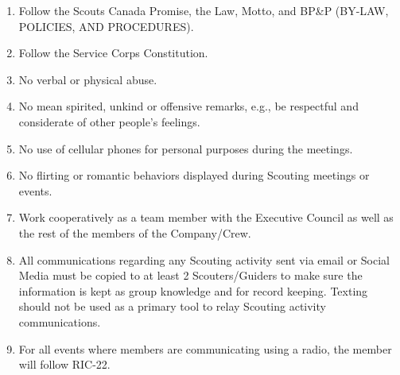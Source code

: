 \documentclass{Service_Corps_Document}
\begin{document}
    \def \Title {Code of Conduct}
    \def \Company {Service Corps}
    \def \versionNumber {3.0}
    \stdFooter
    \begin{titlepage}
        \stdTitlePage
    \end{titlepage}
    \begin{enumerate}
        \item Follow the Scouts Canada Promise, the Law, Motto, and BP\&P (BY-LAW, POLICIES, AND PROCEDURES).
        \item Follow the Service Corps Constitution.
        \item No verbal or physical abuse.
        \item No mean spirited, unkind or offensive remarks, e.g., be respectful and considerate of other people's feelings.
        \item No use of cellular phones for personal purposes during the meetings.
        \item No flirting or romantic behaviors displayed during Scouting meetings or events.
        \item Work cooperatively as a team member with the Executive Council as well as the rest of the members of the Company/Crew.
        \item All communications regarding any Scouting activity sent via email or Social Media must be copied to at least 2 Scouters/Guiders to make sure the information is kept as group knowledge and for record keeping.
        Texting should not be used as a primary tool to relay Scouting activity communications.
        \item For all events where members are communicating using a radio, the member will follow RIC-22.
    \end{enumerate}
\end{document}
